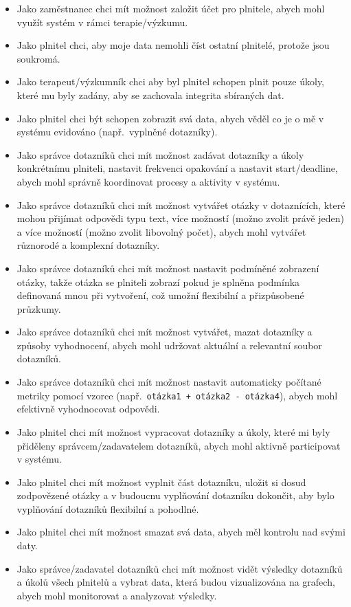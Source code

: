\begin{itemize}
  \item
  Jako zaměstnanec chci mít možnost založit účet pro plnitele, abych mohl využít systém v rámci terapie/výzkumu.
  \item
  Jako plnitel chci, aby moje data nemohli číst ostatní plnitelé, protože jsou soukromá.
  \item
  Jako terapeut/výzkumník chci aby byl plnitel schopen plnit pouze úkoly, které mu byly zadány, aby se zachovala integrita sbíraných dat.
  \item
  Jako plnitel chci být schopen zobrazit svá data, abych věděl co je o mě v systému evidováno (např.\ vyplněné dotazníky).
  \item
  Jako správce dotazníků chci mít možnost zadávat dotazníky a úkoly konkrétnímu plniteli, nastavit frekvenci opakování a nastavit start/deadline, abych mohl správně koordinovat procesy a aktivity v systému.
  \item
  Jako správce dotazníků chci mít možnost vytvářet otázky v dotaznících, které mohou přijímat odpovědi typu text, více možností (možno zvolit právě jeden) a více možností (možno zvolit libovolný počet), abych mohl vytvářet různorodé a komplexní dotazníky.
  \item
  Jako správce dotazníků chci mít možnost nastavit podmíněné zobrazení otázky, takže otázka se plniteli zobrazí pokud je splněna podmínka definovaná mnou při vytvoření, což umožní flexibilní a přizpůsobené průzkumy.
  \item
  Jako správce dotazníků chci mít možnost vytvářet, mazat dotazníky a způsoby vyhodnocení, abych mohl udržovat aktuální a relevantní soubor dotazníků.
  \item
  Jako správce dotazníků chci mít možnost nastavit automaticky počítané metriky pomocí vzorce (např.\ \texttt{otázka1 + otázka2 - otázka4}), abych mohl efektivně vyhodnocovat odpovědi.
  \item
  Jako plnitel chci mít možnost vypracovat dotazníky a úkoly, které mi byly přiděleny správcem/zadavatelem dotazníků, abych mohl aktivně participovat v systému.
  \item
  Jako plnitel chci mít možnost vyplnit část dotazníku, uložit si dosud zodpovězené otázky a v budoucnu vyplňování dotazníku dokončit, aby bylo vyplňování dotazníků flexibilní a pohodlné.
  \item
  Jako plnitel chci mít možnost smazat svá data, abych měl kontrolu nad svými daty.
  \item
  Jako správce/zadavatel dotazníků chci mít možnost vidět výsledky dotazníků a úkolů všech plnitelů a vybrat data, která budou vizualizována na grafech, abych mohl monitorovat a analyzovat výsledky.

\end{itemize}
